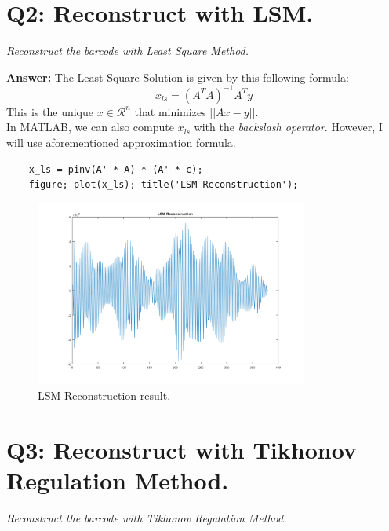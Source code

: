 \documentclass[a4paper,12pt]{article}
\begin{document}
\section*{Q2: Reconstruct with LSM.}
\setcounter{section}{1}

\textit{Reconstruct the barcode with Least Square Method.} 

\vspace{1.5em}
\noindent
\textbf{Answer:} 
\noindent
The Least Square Solution is given by this following formula:
$$ x_{ls} = (A^TA)^{-1}A^Ty $$
This is the unique $x \in \mathcal{R}^n$ that minimizes $||Ax-y||$.
\\
In MATLAB, we can also compute $x_{ls}$ with the \emph{backslash operator}. However, I will use aforementioned approximation formula.

\begin{lstlisting}[caption={MATLAB code for Least Square Method.}]
	% Approximate Least Square Solution
	x_ls = pinv(A' * A) * (A' * c);
	figure; plot(x_ls); title('LSM Reconstruction');
\end{lstlisting}

\begin{figure}[h]
	\centering
	\includegraphics[width=0.8\textwidth]{LSM_graph.png}
	\caption{LSM Reconstruction result.}
	\label{fig:lsm}
\end{figure}







\section*{Q3: Reconstruct with Tikhonov Regulation Method.}
\setcounter{section}{1}

\textit{Reconstruct the barcode with Tikhonov Regulation Method.} 
\end{document}

